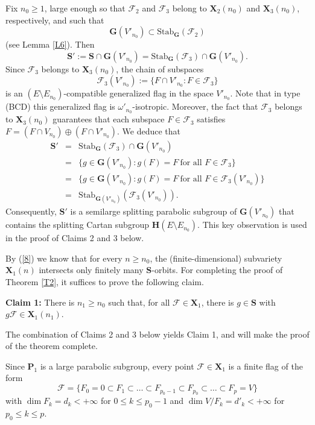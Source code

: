 \documentclass[12pt]{amsart}
\newcommand{\G}{\mathbf{G}}
\renewcommand{\H}{\mathbf{H}}
\renewcommand{\P}{\mathbf{P}}
\newcommand{\X}{\mathbf{X}}
\newcommand{\Ff}{\mathcal{F}}
\newcommand{\Stab}{\mathrm{Stab}}
\numberwithin{equation}{section}
\theoremstyle{definition}
\begin{document}
Fix $n_0\geq 1$, large enough so that $\Ff_2$ and $\Ff_3$ belong to $\X_2(n_0)$ and $\X_3(n_0)$, respectively, and such that
\[\G(V'_{n_0})\subset\Stab_\G(\Ff_2)\]
(see Lemma \ref{L6}). Then
\[\mathbf{S}':=\mathbf{S}\cap\G(V'_{n_0})=\Stab_\G(\Ff_3)\cap \G(V'_{n_0}).\]
Since $\Ff_3$ belongs to $\X_3(n_0)$, the chain of subspaces
\[\Ff_3(V'_{n_0}):=\{F\cap V'_{n_0}:F\in\Ff_3\}\]
is an $(E\setminus E_{n_0})$-compatible generalized flag in the space $V'_{n_0}$.
Note that in type (BCD) this generalized flag is $\omega'_{n_0}$-isotropic.
Moreover, the fact that $\Ff_3$ belongs to $\X_3(n_0)$ guarantees that each subspace $F\in\Ff_3$ satisfies $F=(F\cap V_{n_0})\oplus(F\cap V'_{n_0})$. 
We deduce that
\begin{eqnarray*}
\mathbf{S}' & = & \Stab_\G(\Ff_3)\cap\G(V'_{n_0}) \\ & = & \{g\in \G(V'_{n_0}):g(F)=F\ \mbox{for all $F\in\Ff_3$}\} \\
 & = & \{g\in \G(V'_{n_0}):g(F)=F\ \mbox{for all $F\in\Ff_3(V'_{n_0})$}\} \\
 & = & \Stab_{\G(V'_{n_0})}(\Ff_3(V'_{n_0})).
\end{eqnarray*}
Consequently, $\mathbf{S}'$ is a semilarge splitting parabolic subgroup of $\G(V'_{n_0})$ that contains the splitting Cartan subgroup $\H(E\setminus E_{n_0})$.
This key observation is used in the proof of Claims 2 and 3 below.

By (\ref{8}) we know that for every $n\geq n_0$, the (finite-dimensional) subvariety $\X_1(n)$ intersects only finitely many $\mathbf{S}$-orbits.
For completing the proof of Theorem \ref{T2}, it suffices to prove the following claim.

\medskip
{\bf Claim 1:} There is $n_1\geq n_0$ such that, for all $\Ff\in\X_1$, there is $g\in \mathbf{S}$ with  $g\Ff\in\X_1(n_1)$.

\medskip
The combination of Claims 2 and 3 below yields Claim 1, and will make the proof of the theorem complete.

Since $\P_1$ is a large parabolic subgroup, every point $\Ff\in\X_1$ is a finite flag of the form
\[\Ff=\{F_0=0\subset F_1\subset \ldots\subset F_{p_0-1}\subset F_{p_0}\subset\ldots\subset F_p=V\}\]
with $\dim F_k=d_k<+\infty$ for $0\leq k\leq p_0-1$ and $\dim V/F_k=d'_k<+\infty$ for $p_0\leq k\leq p$. 
\end{document}
